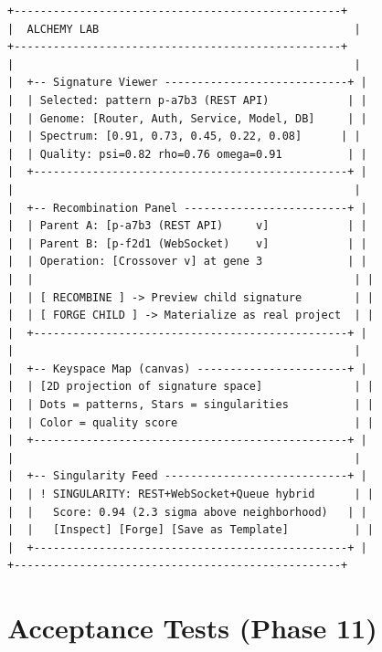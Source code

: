 \documentclass[11pt,a4paper,twoside]{article}
\theoremstyle{definition}
\theoremstyle{plain}
\theoremstyle{remark}
\begin{document}
\begin{lstlisting}[title={New Studio View: The Alchemy Lab}]
+--------------------------------------------------+
|  ALCHEMY LAB                                       |
+--------------------------------------------------+
|                                                    |
|  +-- Signature Viewer ----------------------------+ |
|  | Selected: pattern p-a7b3 (REST API)            | |
|  | Genome: [Router, Auth, Service, Model, DB]     | |
|  | Spectrum: [0.91, 0.73, 0.45, 0.22, 0.08]      | |
|  | Quality: psi=0.82 rho=0.76 omega=0.91          | |
|  +------------------------------------------------+ |
|                                                    |
|  +-- Recombination Panel -------------------------+ |
|  | Parent A: [p-a7b3 (REST API)     v]            | |
|  | Parent B: [p-f2d1 (WebSocket)    v]            | |
|  | Operation: [Crossover v] at gene 3             | |
|  |                                                 | |
|  | [ RECOMBINE ] -> Preview child signature        | |
|  | [ FORGE CHILD ] -> Materialize as real project  | |
|  +------------------------------------------------+ |
|                                                    |
|  +-- Keyspace Map (canvas) -----------------------+ |
|  | [2D projection of signature space]              | |
|  | Dots = patterns, Stars = singularities          | |
|  | Color = quality score                           | |
|  +------------------------------------------------+ |
|                                                    |
|  +-- Singularity Feed ----------------------------+ |
|  | ! SINGULARITY: REST+WebSocket+Queue hybrid      | |
|  |   Score: 0.94 (2.3 sigma above neighborhood)   | |
|  |   [Inspect] [Forge] [Save as Template]          | |
|  +------------------------------------------------+ |
+--------------------------------------------------+
\end{lstlisting}


\section{Acceptance Tests (Phase 11)}\label{sec:al:tests}
\end{document}
